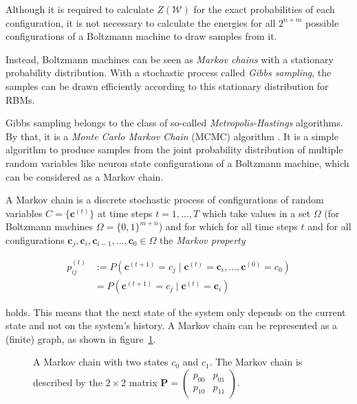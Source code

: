 Although it is required to calculate $Z(\mathcal{W})$ for the exact probabilities of each configuration,
it is not necessary to calculate the energies for all $2^{n+m}$ possible configurations of 
a Boltzmann machine to draw samples from it.

Instead, Boltzmann machines can be seen as \textit{Markov chains} with a stationary probability
distribution. With a stochastic process called \textit{Gibbs sampling}, the samples can be drawn efficiently according to this stationary distribution for RBMs.

Gibbs sampling belongs to the class of so-called \textit{Metropolis-Hastings} algorithms. By that, it is 
a \textit{Monte Carlo Markov Chain} (MCMC) algorithm \cite{hastings1970monte}. It is a simple algorithm to produce samples from the joint probability distribution of multiple random variables like neuron state configurations
of a Boltzmann machine, which can be considered as a Markov chain.

A Markov chain is a discrete stochastic process of configurations of random variables $C=\{\bm{c}^{(t)}\}$
at time steps $t=1, \dots, T$ which take values in a set $\Omega$ (for Boltzmann machines 
$\Omega=\{0,1\}^{m+n}$) and for which for all time steps $t$ and for all configurations 
$\bm{c}_j, \bm{c}_i, \bm{c}_{i-1}, \dots, \bm{c}_0 \in \Omega$ the \textit{Markov property}

\begin{align}
    p_{ij}^{(t)} &:= P(\bm{c}^{(t+1)} = c_j \mid \bm{c}^{(t)} = \bm{c}_i, \dots, \bm{c}^{(0)} = c_0) \\
                 & = P(\bm{c}^{(t+1)} = c_j \mid \bm{c}^{(t)} = \bm{c}_i) 
\end{align}

holds. This means that the next state of the system only depends on the current state and not on the system's history. A Markov chain can be represented as a (finite) graph, as shown in figure~\ref{fig:markov}.

\begin{figure}[H]
    \centering
    \caption[Markov Chain with two States]{A Markov chain with two states $c_0$ and $c_1$. The Markov chain is 
described by the $2 \times 2$ matrix $\bm{P}=\begin{pmatrix} p_{00} & p_{01} \\ p_{10} & p_{11} \end{pmatrix}$.}
    \label{fig:markov}
\end{figure}

